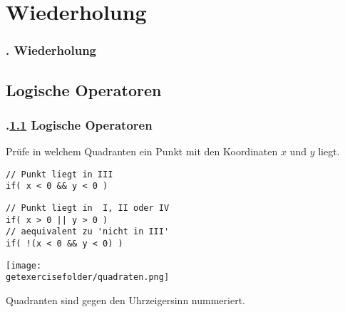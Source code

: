 \section{Wiederholung}\label{K:wdh}
\begin{frame}
  \frametitle{\kap. Wiederholung}%
\tableofcontents[current]
\end{frame}


\def\sstitle{Logische Operatoren}
\subsection{\sstitle}\label{S:LogiOperatoren}
\begin{frame}[fragile]%
  \frametitle{\kap.\ref{S:LogiOperatoren} \sstitle}%

\begin{minipage}[c][6.5cm][t]{0.55\textwidth}
Prüfe in welchem Quadranten ein Punkt mit den Koordinaten $x$ und $y$ liegt.
\vfill

\begin{lstlisting}[style=java, frame=single]
// Punkt liegt in III
if( x < 0 && y < 0 )
\end{lstlisting}
\begin{lstlisting}[style=java, frame=single]
// Punkt liegt in  I, II oder IV
if( x > 0 || y > 0 )
// aequivalent zu 'nicht in III'
if( !(x < 0 && y < 0) )
\end{lstlisting}
\end{minipage}
\hfill
\begin{minipage}[c][6cm][t]{0.4\textwidth}
\begin{center}
\texttt{[image: \\getexercisefolder/quadraten.png]}
\vfill

Quadranten sind gegen den Uhrzeigersinn nummeriert.
\end{center}
\end{minipage}
\end{frame}

\def\stitle{De Morgansche Gesetze}
